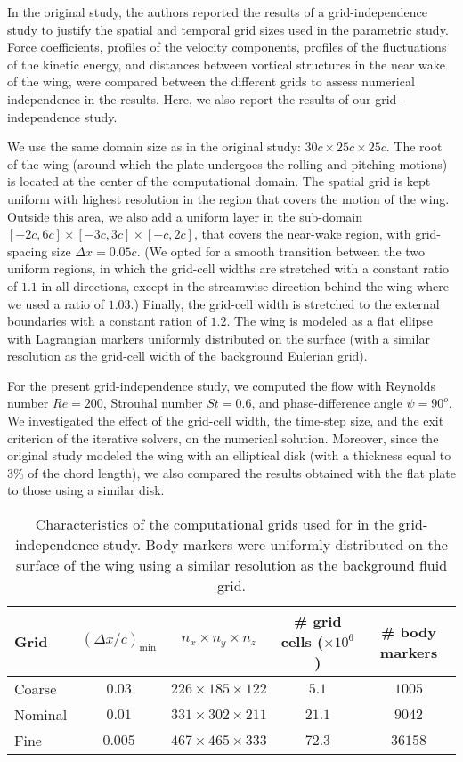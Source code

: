 In the original study, the authors reported the results of a grid-independence study to justify the spatial and temporal grid sizes used in the parametric study.
Force coefficients, profiles of the velocity components, profiles of the fluctuations of the kinetic energy, and distances between vortical structures in the near wake of the wing, were compared between the different grids to assess numerical independence in the results.
Here, we also report the results of our grid-independence study.

We use the same domain size as in the original study: $30c \times 25c \times 25c$.
The root of the wing (around which the plate undergoes the rolling and pitching motions) is located at the center of the computational domain.
The spatial grid is kept uniform with highest resolution in the region that covers the motion of the wing.
Outside this area, we also add a uniform layer in the sub-domain $\left[ -2c, 6c \right] \times \left[ -3c, 3c \right] \times \left[ -c, 2c \right]$, that covers the near-wake region, with grid-spacing size $\Delta x = 0.05c$.
(We opted for a smooth transition between the two uniform regions, in which the grid-cell widths are stretched with a constant ratio of $1.1$ in all directions, except in the streamwise direction behind the wing where we used a ratio of $1.03$.)
Finally, the grid-cell width is stretched to the external boundaries with a constant ration of $1.2$.
The wing is modeled as a flat ellipse with Lagrangian markers uniformly distributed on the surface (with a similar resolution as the grid-cell width of the background Eulerian grid).

For the present grid-independence study, we computed the flow with Reynolds number $Re = 200$, Strouhal number $St = 0.6$, and phase-difference angle $\psi = 90^o$.
We investigated the effect of the grid-cell width, the time-step size, and the exit criterion of the iterative solvers, on the numerical solution.
Moreover, since the original study modeled the wing with an elliptical disk (with a thickness equal to $3\%$ of the chord length), we also compared the results obtained with the flat plate to those using a similar disk.

\begin{table}
  \centering
  \begin{tabular}{lcccc}
    \hline\hline
    Grid & $(\Delta x / c)_\text{min}$ & $n_x \times n_y \times n_z$ & \# grid cells ($\times 10^6$) & \# body markers \\
    \hline
    Coarse & $0.03$ & $226 \times 185 \times 122$ & $5.1$ & $1005$ \\
    Nominal & $0.01$ & $331 \times 302 \times 211$ & $21.1$ & $9042$ \\
    Fine & $0.005$ & $467 \times 465 \times 333$ & $72.3$ & $36158$ \\
    \hline\hline
  \end{tabular}
  \caption{Characteristics of the computational grids used for in the grid-independence study. Body markers were uniformly distributed on the surface of the wing using a similar resolution as the background fluid grid.}
  \label{tab:independence_grid_charateristics}
\end{table}

